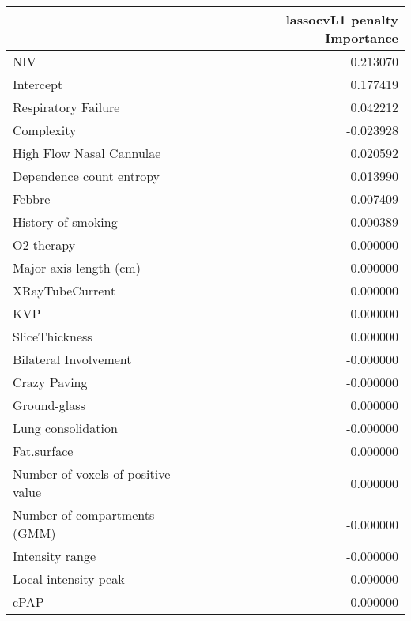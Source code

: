 {\begin{tabular}{lr}
\toprule
{} &  lassocvL1 penalty Importance \\
\midrule
NIV                                 &                      0.213070 \\
Intercept                           &                      0.177419 \\
Respiratory Failure                 &                      0.042212 \\
Complexity                          &                     -0.023928 \\
High Flow Nasal Cannulae            &                      0.020592 \\
Dependence count entropy            &                      0.013990 \\
Febbre                              &                      0.007409 \\
History of smoking                  &                      0.000389 \\
O2-therapy                          &                      0.000000 \\
Major axis length (cm)              &                      0.000000 \\
XRayTubeCurrent                     &                      0.000000 \\
KVP                                 &                      0.000000 \\
SliceThickness                      &                      0.000000 \\
Bilateral Involvement               &                     -0.000000 \\
Crazy Paving                        &                     -0.000000 \\
Ground-glass                        &                      0.000000 \\
Lung consolidation                  &                     -0.000000 \\
Fat.surface                         &                      0.000000 \\
Number of voxels of positive value  &                      0.000000 \\
Number of compartments (GMM)        &                     -0.000000 \\
Intensity range                     &                     -0.000000 \\
Local intensity peak                &                     -0.000000 \\
cPAP                                &                     -0.000000 \\

\end{tabular}}
